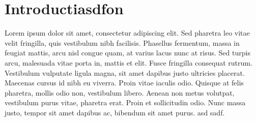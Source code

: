 \documentclass[main.tex]{subfiles}
\begin{document}
\chapter{Introductiasdfon}

Lorem ipsum dolor sit amet, consectetur adipiscing elit. Sed pharetra leo vitae velit fringilla, quis vestibulum nibh facilisis. Phasellus fermentum, massa in feugiat mattis, arcu nisl congue quam, at varius lacus nunc at risus. Sed turpis arcu, malesuada vitae porta in, mattis et elit. Fusce fringilla consequat rutrum. Vestibulum vulputate ligula magna, sit amet dapibus justo ultricies placerat. Maecenas cursus id nibh eu viverra. Proin vitae iaculis odio. Quisque at felis pharetra, mollis odio non, vestibulum libero. Aenean non metus volutpat, vestibulum purus vitae, pharetra erat. Proin et sollicitudin odio. Nunc massa justo, tempor sit amet dapibus ac, bibendum sit amet purus. asd sadf.
\end{document}
